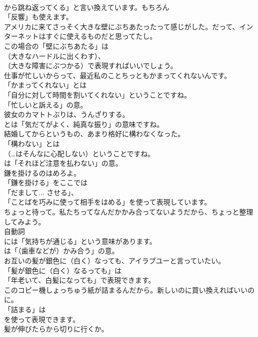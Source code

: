 \documentclass[8pt]{extreport}
\begin{document}
\begin{CJK}{UTF8}{min}
\\	から跳ね返ってくる」と言い換えています。もちろん
\\	「反響」も使えます。	
\\	アメリカに来てさっそく大きな壁にぶちあたったって感じがした。だって、インターネットはすぐに使えるものだと思ってたし。 
\\	この場合の「壁にぶちあたる」は 
\\	（大きなハードルに出くわす）、
\\	（大きな障害にぶつかる）で表現すればいいでしょう。	
\\	仕事が忙しいからって、最近私のことちっともかまってくれないんです。 
\\	「かまってくれない」とは
\\	「自分に対して時間を割いてくれない」ということですね。
\\	「忙しいと訴える」の意。	
\\	彼女のカマトトぶりは、うんざりする。 
\\	とは「気だてがよく、純真な振り」の意味ですね。	
\\	結婚してからというもの、あまり格好に構わなくなった。 
\\	「構わない」とは
\\	（…はそんなに心配しない）ということですね。
\\	は「それほど注意を払わない」の意。	
\\	鎌を掛けるのはめろよ。 
\\	「鎌を掛ける」をここでは
\\	「だまして... させる」、
\\	「ことばを巧みに使って相手をはめる」を使って表現しています。	
\\	ちょっと待って。私たちってなんだかかみ合ってないようだから、ちょっと整理してみよう。 
\\	自動詞
\\	には「気持ちが通じる」という意味があります。
\\	は「（歯車などが）かみ合う」の意。	
\\	お互いの髪が銀色に（白く）なっても、アイラブユーと言っていたい。 
\\	「髪が銀色に（白く）なるっても」は
\\	「年老いて、白髪になっても」で表現できます。	
\\	このコピー機しょっちゅう紙が詰まるんだから。新しいのに買い換えればいいのに。 
\\	「詰まる」は
\\	を使って表現できます。	
\\	髪が伸びたらから切りに行くか。 

\end{CJK}
\end{document}
